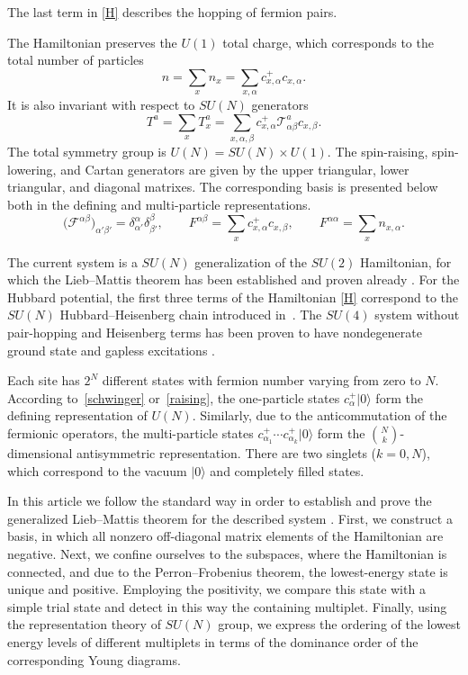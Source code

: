 The last term   in \eqref{H} describes the hopping of
fermion pairs.

The Hamiltonian preserves the $U(1)$ total charge, which corresponds to the total number
of particles
\begin{equation*}
n=\sum_{x} n_x=\sum_{x,\alpha}c_{x,\alpha}^+c_{x,\alpha}.
\end{equation*}
It is also invariant with respect to $SU(N)$ generators
\begin{equation*}
T^a=\sum_x T^a_x= \sum_{x,\alpha,\beta}c_{x,\alpha}^+ \mathcal{T}^a_{\alpha\beta}c_{x,\beta}.
\end{equation*}
The total symmetry group is $U(N)=SU(N)\times U(1)$.
The spin-raising, spin-lowering, and Cartan generators are given by
the upper triangular, lower triangular, and diagonal
matrixes. The corresponding basis is presented below
both in the def\/ining and multi-particle representations.
\begin{equation}
\label{raising}
\big(\mathcal{F}^{\alpha\beta}\big)_{\alpha'\beta'}=\delta^\alpha_{\alpha'}\delta^\beta_{\beta'},
\qquad
F^{\alpha\beta}=\sum_x c_{x,\alpha}^+ c_{x,\beta},
\qquad
F^{\alpha\alpha}=\sum_x n_{x,\alpha}.
\end{equation}

The current system  is a $SU(N)$ generalization of the $SU(2)$ Hamiltonian,
for which the Lieb--Mattis theorem  has been established
and proven already \cite{Amb92-2}.
For the Hubbard potential, the
f\/irst three terms of the Hamiltonian \eqref{H}
correspond to the $SU(N)$ Hubbard--Heisenberg chain
introduced in~\cite{MA89}.
The $SU(4)$ system without pair-hopping and Heisenberg terms has been proven to have  nondegenerate
ground state and gapless excitations \cite{LTML04}.

Each site has $2^N$ dif\/ferent states with fermion number varying from
zero to $N$.
According to~\eqref{schwinger} or~\eqref{raising},
the one-particle states $c^+_{\alpha}|0\rangle$ form the def\/ining
representation of $U(N)$.
Similarly, due to the anticommutation of the fermionic operators,
the multi-particle states $c^+_{\alpha_1}\cdots c^+_{\alpha_k}|0\rangle $
form the $\binom{N}{k}$-dimensional antisymmetric representation.
There are two singlets ($k=0,N$), which correspond to
the vacuum $|0\rangle $ and completely f\/illed states.

In this article we follow the standard way in order to establish and prove the generalized Lieb--Mattis
theorem for the described system \cite{LM62,H07}. First, we construct a basis, in which all
nonzero of\/f-diagonal matrix elements of the Hamiltonian are negative.
Next, we conf\/ine ourselves to the subspaces, where the Hamiltonian is connected,
and due to the Perron--Frobenius theorem, the lowest-energy state
is unique and positive. Employing the positivity, we compare this state with a simple trial state
and detect in this way  the containing multiplet.
Finally, using the representation theory of $SU(N)$ group, we express the ordering
of the lowest energy levels of dif\/ferent multiplets in terms of the dominance
order of the corresponding Young diagrams.


